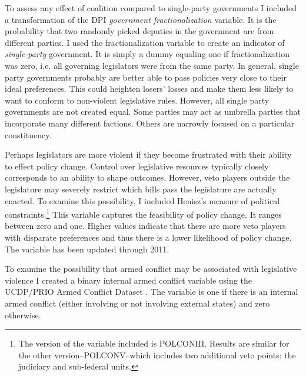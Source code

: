 \documentclass[a4paper]{article}\usepackage[]{graphicx}\usepackage[]{color}
\begin{document}
To assess any effect of coalition compared to single-party governments I included a transformation of the DPI {\emph{government fractionalization}} variable. It is the probability that two randomly picked deputies in the government are from different parties. I used the fractionalization variable to create an indicator of {\emph{single-party}} government. It is simply a dummy equaling one if fractionalization was zero, i.e. all governing legislators were from the same party. In general, single party governments probably are better able to pass policies very close to their ideal preferences. This could heighten losers' losses and make them less likely to want to conform to non-violent legislative rules. However, all single party governments are not created equal. Some parties may act as umbrella parties that incorporate many different factions. Others are narrowly focused on a particular constituency.

Perhaps legislators are more violent if they become frustrated with their ability to effect policy change. Control over legislative resources typically closely corresponds to an ability to shape outcomes. However, veto players outside the legislature may severely restrict which bills pass the legislature are actually enacted. To examine this possibility, I included Henisz's \citeyearpar{Henisz2004} measure of political constraints.\footnote{The version of the variable included is POLCONIII. Results are similar for the other version--POLCONV--which includes two additional veto points: the judiciary and sub-federal units.} This variable captures the feasibility of policy change. It ranges between zero and one. Higher values indicate that there are more veto players with disparate preferences and thus there is a lower likelihood of policy change. The variable has been updated through 2011.

To examine the possibility that armed conflict may be associated with legislative violence I created a binary internal armed conflict variable using the UCDP/PRIO Armed Conflict Dataset \citep{Themner2014}. The variable is one if there is an internal armed conflict (either involving or not involving external states) and zero otherwise.
\end{document}
